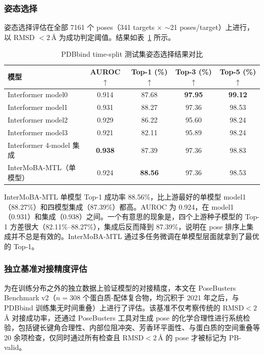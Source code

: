 \subsubsection{姿态选择}

姿态选择评估在全部 7161 个 poses（341 targets $\times$ $\sim$21 poses/target）上进行，以 RMSD $< 2\,\text{\AA}$ 为成功判定阈值。结果如表~\ref{T.pose_results} 所示。

\clearpage
\begin{table}[htb]
  \centering
  \caption{PDBbind time-split 测试集姿态选择结果对比}
  \label{T.pose_results}
  \small
  \begin{tabular}{lcccc}
    \toprule
    模型 & AUROC $\uparrow$ & Top-1 (\%) $\uparrow$ & Top-3 (\%) $\uparrow$ & Top-5 (\%) $\uparrow$ \\
    \midrule
    Interformer model0\cite{lai2024interformer} & 0.914 & 87.68 & \textbf{97.95} & \textbf{99.12} \\
    Interformer model1\cite{lai2024interformer} & 0.931 & 88.27 & 97.36 & 98.53 \\
    Interformer model2\cite{lai2024interformer} & 0.929 & 86.22 & 95.60 & 98.24 \\
    Interformer model3\cite{lai2024interformer} & 0.921 & 82.11 & 95.89 & 98.24 \\
    Interformer 4-model 集成\cite{lai2024interformer} & \textbf{0.938} & 87.39 & 97.36 & 98.83 \\
    \midrule
    InterMoBA-MTL（单模型） & 0.924 & \textbf{88.56} & 97.36 & 98.53 \\
    \bottomrule
  \end{tabular}
\end{table}

InterMoBA-MTL 单模型 Top-1 成功率 88.56\%，比上游最好的单模型 model1（88.27\%）和四模型集成（87.39\%）都高。AUROC 为 0.924，在 model1（0.931）和集成（0.938）之间。一个有意思的现象是，四个上游种子模型的 Top-1 方差很大（82.11\%--88.27\%），集成后反而降到 87.39\%，说明在 pose 排序上集成并不总是有效的。InterMoBA-MTL 通过多任务微调在单模型层面就拿到了最优的 Top-1。

\subsubsection{独立基准对接精度评估}

为在训练分布之外的独立数据上验证模型的对接精度，本文在 PoseBusters Benchmark v2\cite{buttenschoen2024posebusters}（$n=308$ 个蛋白质-配体复合物，均沉积于 2021 年之后，与 PDBbind 训练集无时间重叠）上进行了评估。该基准不仅考察传统的 RMSD$<2$\,\AA{} 对接成功率，还通过 PoseBusters 工具对生成 pose 的化学合理性进行系统检验，包括键长键角合理性、内部位阻冲突、芳香环平面性、与蛋白质的空间重叠等 20 余项检查，仅同时通过所有检查且 RMSD$<2$\,\AA{} 的 pose 才被标记为 PB-valid。

